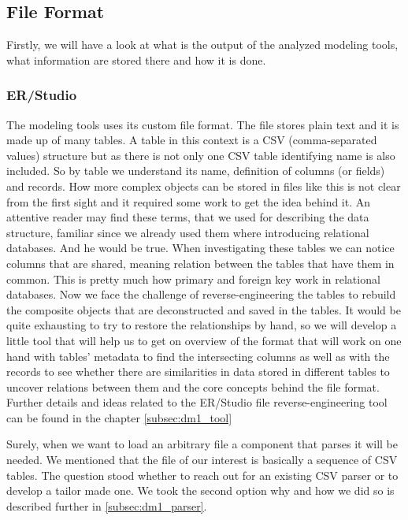 \subsection{File Format}

Firstly, we will have a look at what is the output of the analyzed modeling tools, what information are stored there and how it is done.

\subsubsection{ER/Studio}
The modeling tools uses its custom file format. The file stores plain text and it is made up of many tables. A table in this context is a CSV (comma-separated values) structure but as there is not only one CSV table identifying name is also included. So by table we understand its name, definition of columns (or fields) and records. 
How more complex objects can be stored in files like this is not clear from the first sight and it required some work to get the idea behind it.  
An attentive reader may find these terms, that we used for describing the data structure, familiar since we already used them where introducing relational databases. And he would be true. When investigating these tables we can notice columns that are shared, meaning relation between the tables that have them in common. This is pretty much how primary and foreign key work in relational databases.
Now we face the challenge of reverse-engineering the tables to rebuild the composite objects that are deconstructed and saved in the tables.
It would be quite exhausting to try to restore the relationships by hand, so we will develop a little tool that will help us to get on overview of the format that will work on one hand with tables' metadata to find the intersecting columns as well as with the records to see whether there are similarities in data stored in different tables to uncover relations between them and the core concepts behind the file format.
Further details and ideas related to the ER/Studio file reverse-engineering tool can be found in the chapter \autoref{subsec:dm1_tool}

Surely, when we want to load an arbitrary file a component that parses it will be needed. 
We mentioned that the file of our interest is basically a sequence of CSV tables. The question stood whether to reach out for an existing CSV parser or to develop a tailor made one. We took the second option why and how we did so is described further in  \autoref{subsec:dm1_parser}.


